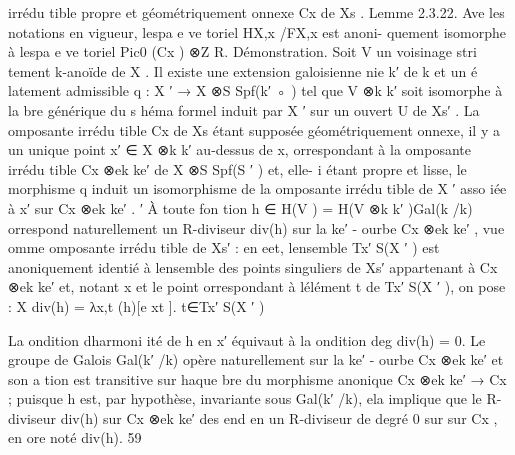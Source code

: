 \documentclass[
  10pt,
]{article}
\newenvironment{Shaded}{}{}
\newcommand{\NormalTok}[1]{#1}
\begin{document}
\begin{Shaded}
\begin{Highlighting}[]
\NormalTok{irrédu tible propre et géométriquement onnexe Cx de Xs .}
\NormalTok{Lemme 2.3.22.  Ave les notations en vigueur, l\textquotesingle{}espa e ve toriel HX,x /FX,x est anoni{-}}
\NormalTok{quement isomorphe à l\textquotesingle{}espa e ve toriel Pic0 (Cx ) ⊗Z R.}
\NormalTok{Démonstration. Soit V un voisinage stri tement k{-}anoïde de X . Il existe une extension}
\NormalTok{galoisienne nie k′ de k et un é latement admissible q : X ′ → X ⊗S Spf(k′ ◦ ) tel que V ⊗k k′}
\NormalTok{soit isomorphe à la bre générique du s héma formel induit par X ′ sur un ouvert U de Xs′ . La}
\NormalTok{ omposante irrédu tible Cx de Xs étant supposée géométriquement onnexe, il y a un unique}
\NormalTok{point x′ ∈ X ⊗k k′ au{-}dessus de x, orrespondant à la omposante irrédu tible Cx ⊗ek ke′ de}
\NormalTok{X ⊗S Spf(S ′ ) et, elle{-} i étant propre et lisse, le morphisme q induit un isomorphisme de la}
\NormalTok{ omposante irrédu tible de X ′ asso iée à x′ sur Cx ⊗ek ke′ .}
\NormalTok{                                                               ′}
\NormalTok{    À toute fon tion h ∈ H(V ) = H(V ⊗k k′ )Gal(k /k) orrespond naturellement un R{-}diviseur}
\NormalTok{div(h) sur la ke′ {-} ourbe Cx ⊗ek ke′ , vue omme omposante irrédu tible de Xs′ : en eet, l\textquotesingle{}ensemble}
\NormalTok{Tx′ S(X ′ ) est anoniquement identié à l\textquotesingle{}ensemble des points singuliers de Xs′ appartenant à}
\NormalTok{Cx ⊗ek ke′ et, notant x      et le point orrespondant à l\textquotesingle{}élément t de Tx′ S(X ′ ), on pose :}
\NormalTok{                                                          X}
\NormalTok{                                            div(h) =             λx,t (h)[e}
\NormalTok{                                                                          xt ].}
\NormalTok{                                              t∈Tx′ S(X ′ )}

\NormalTok{La ondition d\textquotesingle{}harmoni ité de h en x′ équivaut à la ondition}
\NormalTok{                                            deg div(h) = 0.}
\NormalTok{   Le groupe de Galois Gal(k′ /k) opère naturellement sur la ke′ {-} ourbe Cx ⊗ek ke′ et son a tion}
\NormalTok{est transitive sur haque bre du morphisme anonique Cx ⊗ek ke′ → Cx ; puisque h est, par}
\NormalTok{hypothèse, invariante sous Gal(k′ /k), ela implique que le R{-}diviseur div(h) sur Cx ⊗ek ke′}
\NormalTok{des end en un R{-}diviseur de degré 0 sur sur Cx , en ore noté div(h).}
\NormalTok{                                                                                                59}




\end{Highlighting}
\end{Shaded}
\end{document}
